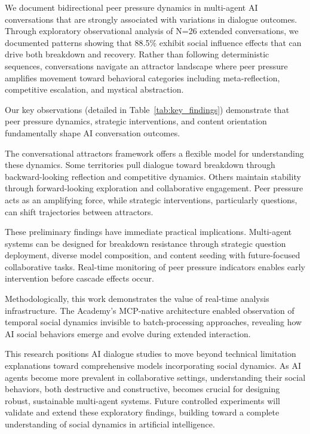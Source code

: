 \documentclass[11pt,letterpaper]{article}
\newcommand{\theacademy}{The Academy}
\newcommand{\exponedataTotalSessionsRaw}{26}
\newcommand{\exponedataTotalSessions}{N=\exponedataTotalSessionsRaw}
\newcommand{\exponedataPeerPressurePercentage}{88.5\%}
\begin{document}
We document bidirectional peer pressure dynamics in multi-agent AI conversations that are strongly associated with variations in dialogue outcomes. Through exploratory observational analysis of \exponedataTotalSessions{} extended conversations, we documented patterns showing that \exponedataPeerPressurePercentage{} exhibit social influence effects that can drive both breakdown and recovery. Rather than following deterministic sequences, conversations navigate an attractor landscape where peer pressure amplifies movement toward behavioral categories including meta-reflection, competitive escalation, and mystical abstraction.

Our key observations (detailed in Table~\ref{tab:key_findings}) demonstrate that peer pressure dynamics, strategic interventions, and content orientation fundamentally shape AI conversation outcomes.

The conversational attractors framework offers a flexible model for understanding these dynamics. Some territories pull dialogue toward breakdown through backward-looking reflection and competitive dynamics. Others maintain stability through forward-looking exploration and collaborative engagement. Peer pressure acts as an amplifying force, while strategic interventions, particularly questions, can shift trajectories between attractors.

These preliminary findings have immediate practical implications. Multi-agent systems can be designed for breakdown resistance through strategic question deployment, diverse model composition, and content seeding with future-focused collaborative tasks. Real-time monitoring of peer pressure indicators enables early intervention before cascade effects occur.

Methodologically, this work demonstrates the value of real-time analysis infrastructure. \theacademy{}'s MCP-native architecture enabled observation of temporal social dynamics invisible to batch-processing approaches, revealing how AI social behaviors emerge and evolve during extended interaction.

This research positions AI dialogue studies to move beyond technical limitation explanations toward comprehensive models incorporating social dynamics. As AI agents become more prevalent in collaborative settings, understanding their social behaviors, both destructive and constructive, becomes crucial for designing robust, sustainable multi-agent systems. Future controlled experiments will validate and extend these exploratory findings, building toward a complete understanding of social dynamics in artificial intelligence.
\end{document}

